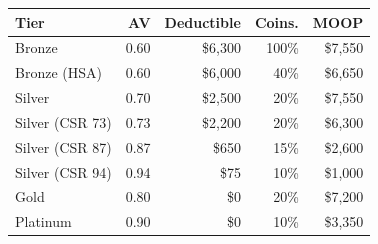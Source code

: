 \begin{tabular}{lrrrr}
\hline\hline
Tier & AV & Deductible & Coins. & MOOP \\
\hline
Bronze & 0.60 & \$6,300 & 100\% & \$7,550 \\
Bronze (HSA) & 0.60 & \$6,000 & 40\% & \$6,650 \\
Silver & 0.70 & \$2,500 & 20\% & \$7,550 \\
Silver (CSR 73) & 0.73 & \$2,200 & 20\% & \$6,300 \\
Silver (CSR 87) & 0.87 & \$650 & 15\% & \$2,600 \\
Silver (CSR 94) & 0.94 & \$75 & 10\% & \$1,000 \\
Gold & 0.80 & \$0 & 20\% & \$7,200 \\
Platinum & 0.90 & \$0 & 10\% & \$3,350 \\
\hline\hline
\end{tabular}
